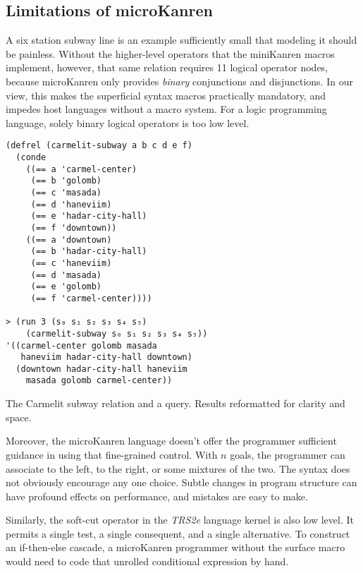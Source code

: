 \documentclass[sigplan,balance=true,pbalance=true,natbib=false]{acmart}
\begin{document}
\subsection{Limitations of microKanren}

A six station subway line is an example sufficiently small that
modeling it should be painless. Without the higher-level operators
that the miniKanren macros implement, however, that same relation
requires 11 logical operator nodes, because microKanren only provides
\emph{binary} conjunctions and disjunctions. In our view, this makes
the superficial syntax macros practically mandatory, and impedes host
languages without a macro system. For a logic programming language,
solely binary logical operators is too low level.

\begin{listing}
  \begin{verbatim}
(defrel (carmelit-subway a b c d e f)
  (conde
    ((== a 'carmel-center)
     (== b 'golomb)
     (== c 'masada)
     (== d 'haneviim)
     (== e 'hadar-city-hall)
     (== f 'downtown))
    ((== a 'downtown)
     (== b 'hadar-city-hall)
     (== c 'haneviim)
     (== d 'masada)
     (== e 'golomb)
     (== f 'carmel-center))))

> (run 3 (s₀ s₁ s₂ s₃ s₄ s₅)
    (carmelit-subway s₀ s₁ s₂ s₃ s₄ s₅))
'((carmel-center golomb masada
   haneviim hadar-city-hall downtown)
  (downtown hadar-city-hall haneviim
    masada golomb carmel-center))
  \end{verbatim}
  \caption{The Carmelit subway relation and a query. Results reformatted for clarity and space.}
  \label{mnt:carmelit}
\end{listing}

Moreover, the microKanren language doesn't offer the programmer
sufficient guidance in using that fine-grained control. With $n$
goals, the programmer can associate to the left, to the right, or some
mixtures of the two. The syntax does not obviously encourage any one
choice. Subtle changes in program structure can have profound effects
on performance, and mistakes are easy to make.

Similarly, the soft-cut operator  in the \emph{TRS2e}
language kernel is also low level. It permits a single test, a single
consequent, and a single alternative. To construct an if-then-else
cascade, a microKanren programmer without the 
surface macro would need to code that unrolled conditional expression
by hand.
\end{document}
